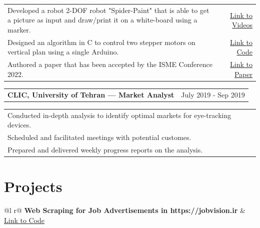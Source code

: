 \documentclass[a4paper,12pt]{article}
\begin{document}
\begin{tabularx}{\linewidth}{@{}X r@{}}
    {Developed a robot 2-DOF robot "Spider-Paint" that is able to get a picture as input and draw/print it on a white-board using a marker.} & \hfill \href{https://github.com/arghavanaslani/spider-paint/blob/'spider-paint'/README.md}{Link to Videos} \\[3.75pt]
    {Designed an algorithm in C to control two stepper motors on vertical plan using a single Arduino.} & \hfill \href{https://github.com/arghavanaslani/spider-paint}{Link to Code} \\[3.75pt]
    {Authored a paper that has been accepted by the ISME Conference 2022.} & \hfill \href{https://civilica.com/doc/1468825/}{Link to Paper} \\[3.75pt]
\end{tabularx}

\vspace{\baselineskip} 

\begin{tabularx}{\linewidth}{@{}X r@{}}
    \textbf{CLIC, University of Tehran — Market Analyst} & \hfill July 2019 - Sep 2019 \\[3.75pt]
\end{tabularx}

\begin{tabularx}{\linewidth}{@{}X r@{}}
    {Conducted in-depth analysis to identify optimal markets for eye-tracking devices.} & \hfill \href{}{} \\[3.75pt]
    {Scheduled and facilitated meetings with potential customes.} & \hfill \href{}{} \\[3.75pt]
    {Prepared and delivered weekly progress reports on the analysis.} & \hfill \href{}{} \\[3.75pt]
\end{tabularx}


\section{Projects}

\begin{tabularx}{\linewidth}{ @{}l r@{} }
\textbf{Web Scraping for Job Advertisements in https://jobvision.ir} & \hfill \href{https://github.com/arghavanaslani/JobAdDB}{Link to Code} \\[3.75pt]
  \\
\end{tabularx}
\end{document}
